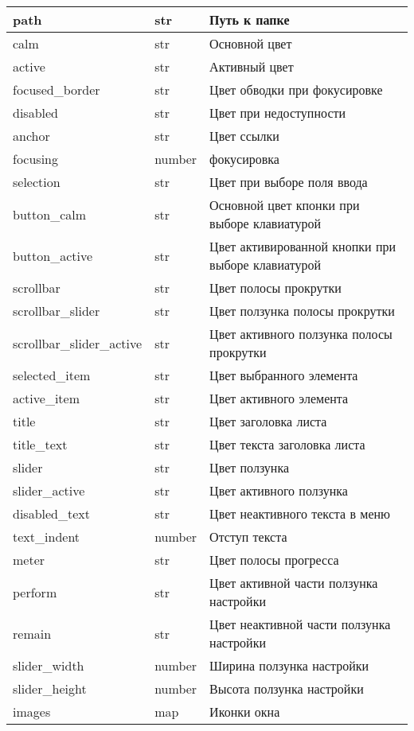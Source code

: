 \begin{xltabular}{\textwidth}{|X|>{\setlength{\baselineskip}{0.7\baselineskip}}p{4.85cm}|>{\setlength{\baselineskip}{0.7\baselineskip}}p{4.85cm}|}
	path & str & Путь к папке \\ \hline
	calm & str & Основной цвет \\ \hline
	active & str & Активный цвет \\ \hline
	focused{\_}border & str & Цвет обводки при фокусировке \\ \hline
	disabled & str & Цвет при недоступности \\ \hline
	anchor & str & Цвет ссылки \\ \hline
	focusing & number & фокусировка \\ \hline
	selection & str & Цвет при выборе поля ввода \\ \hline
	button{\_}calm & str & Основной цвет кпонки при выборе клавиатурой \\ \hline
	button{\_}active & str & Цвет активированной кнопки при выборе клавиатурой \\ \hline
	scrollbar & str & Цвет полосы прокрутки \\ \hline
	scrollbar{\_}slider & str & Цвет ползунка полосы прокрутки \\ \hline
	scrollbar{\_}slider{\_}active & str & Цвет активного ползунка полосы прокрутки \\ \hline
	selected{\_}item & str & Цвет выбранного элемента \\ \hline
	active{\_}item & str & Цвет активного элемента \\ \hline
	title & str & Цвет заголовка листа \\ \hline
	title{\_}text & str & Цвет текста заголовка листа \\ \hline
	slider & str & Цвет ползунка \\ \hline
	slider{\_}active & str & Цвет активного ползунка \\ \hline
	disabled{\_}text & str & Цвет неактивного текста в меню \\ \hline
	text{\_}indent & number & Отступ текста \\ \hline
	meter & str & Цвет полосы прогресса \\ \hline
	perform & str & Цвет активной части ползунка настройки \\ \hline
	remain & str & Цвет неактивной части ползунка настройки  \\ \hline
	slider{\_}width & number & Ширина ползунка настройки \\ \hline
	slider{\_}height & number & Высота ползунка настройки \\ \hline
	images & map & Иконки окна
\end{xltabular}

